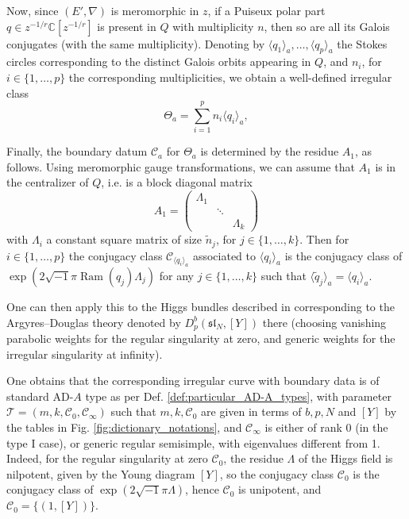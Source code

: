 \documentclass[11pt,a4paper]{amsart}
\numberwithin{equation}{section}
\DeclareMathOperator{\Ram}{Ram}
\newcommand{\cir}[1]{\langle #1 \rangle}
\begin{document}
Now, since $(E', \nabla)$ is meromorphic in $z$, if a Puiseux polar part $q\in z^{-1/r}\mathbb C[z^{-1/r}]$ is present in $Q$ with multiplicity $n$, then so are all its Galois conjugates (with the same multiplicity). Denoting by $\cir{q_1}_a, \dots,\cir{q_p}_a$ the Stokes circles corresponding to the distinct Galois orbits appearing in $Q$, and $n_i$, for $i\in \{1, \dots, p\}$ the corresponding multiplicities, we obtain a well-defined irregular class
\[
\Theta_a=\sum_{i=1}^p n_i\cir{q_i}_a,
\]





Finally, the boundary datum $\mathcal C_a$ for $\Theta_a$ is determined by the residue $A_1$, as follows. Using meromorphic gauge transformations, we can assume that $A_1$ is in the centralizer of $Q$, i.e. is a block diagonal matrix
\begin{equation}
\label{eq:additive_formal_monodromy}
A_1=\begin{pmatrix}
\Lambda_1 & & \\
& \ddots & \\
& & \Lambda_k
\end{pmatrix} 
\end{equation}
with $\Lambda_i$ a constant square matrix of size $\widetilde n_j$, for $j\in\{1, \dots, k\}$.
Then for $i\in \{1, \dots, p\}$ the conjugacy class $\mathcal C_{\cir{q_i}_a}$ associated to $\cir{q_i}_a$ is the conjugacy class of $\exp(2\sqrt{-1}\pi\Ram(q_j)\Lambda_j)$ for any $j\in \{1, \dots, k\}$ such that $\cir{\widetilde q_j}_a=\cir{q_i}_a$.

One can then apply this to the Higgs bundles described in \cite[§2.1]{beem2025simplifying} corresponding to the Argyres--Douglas theory denoted by $D_p^b(\mathfrak{sl}_N, [Y])$ there (choosing vanishing parabolic weights for the regular singularity at zero, and generic weights for the irregular singularity at infinity).

One obtains that the corresponding irregular curve with boundary data is of standard AD-$A$ type as per Def. \ref{def:particular_AD-A_types}, with parameter $\mathcal T=(m,k,\mathcal C_0, \mathcal C_\infty)$ such that $m, k, \mathcal C_0$ are given in terms of $b,p, N$ and $[Y]$ by the tables in Fig. \ref{fig:dictionary_notations}, and $\mathcal C_\infty$ is either of rank 0 (in the type I case), or generic regular semisimple, with eigenvalues different from 1. Indeed, for the regular singularity at zero $\mathcal C_0$, the residue $\Lambda$ of the Higgs field is nilpotent, given by the Young diagram $[Y]$, so the conjugacy class $\mathcal C_0$ is the conjugacy class of $\exp(2\sqrt{-1}\pi \Lambda)$, hence $\mathcal C_0$ is unipotent, and $\mathcal C_0=\{(1,[Y])\}$.
\end{document}
